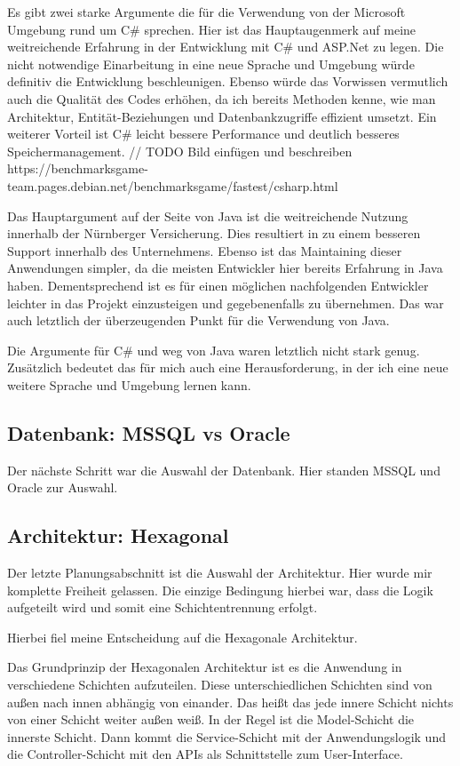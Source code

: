 Es gibt zwei starke Argumente die für die Verwendung von der Microsoft Umgebung rund um C\# sprechen.
Hier ist das Hauptaugenmerk auf meine weitreichende Erfahrung in der Entwicklung mit C\# und ASP.Net zu legen.
Die nicht notwendige Einarbeitung in eine neue Sprache und Umgebung würde definitiv die Entwicklung beschleunigen.
Ebenso würde das Vorwissen vermutlich auch die Qualität des Codes erhöhen, da ich bereits Methoden kenne, wie man Architektur, Entität-Beziehungen und Datenbankzugriffe effizient umsetzt.
Ein weiterer Vorteil ist C\# leicht bessere Performance und deutlich besseres Speichermanagement. 
// TODO Bild einfügen und beschreiben
https://benchmarksgame-team.pages.debian.net/benchmarksgame/fastest/csharp.html

Das Hauptargument auf der Seite von Java ist die weitreichende Nutzung innerhalb der Nürnberger Versicherung. Dies resultiert in zu einem besseren Support innerhalb des Unternehmens.
Ebenso ist das Maintaining dieser Anwendungen simpler, da die meisten Entwickler hier bereits Erfahrung in Java haben. Dementsprechend ist es für einen möglichen nachfolgenden Entwickler leichter
in das Projekt einzusteigen und gegebenenfalls zu übernehmen.
Das war auch letztlich der überzeugenden Punkt für die Verwendung von Java. 

Die Argumente für C\# und weg von Java waren letztlich nicht stark genug.
Zusätzlich bedeutet das für mich auch eine Herausforderung, in der ich eine neue weitere Sprache und Umgebung lernen kann.

\subsection{Datenbank: MSSQL vs Oracle}
Der nächste Schritt war die Auswahl der Datenbank. Hier standen MSSQL und Oracle zur Auswahl.
\subsection{Architektur: Hexagonal}
Der letzte Planungsabschnitt ist die Auswahl der Architektur. Hier wurde mir komplette Freiheit gelassen.
Die einzige Bedingung hierbei war, dass die Logik aufgeteilt wird und somit eine Schichtentrennung erfolgt.

Hierbei fiel meine Entscheidung auf die Hexagonale Architektur.

Das Grundprinzip der Hexagonalen Architektur ist es die Anwendung in verschiedene Schichten aufzuteilen.
Diese unterschiedlichen Schichten sind von außen nach innen abhängig von einander. Das heißt das jede innere Schicht nichts von einer Schicht weiter außen weiß.
In der Regel ist die Model-Schicht die innerste Schicht.
Dann kommt die Service-Schicht mit der Anwendungslogik und die Controller-Schicht mit den APIs als Schnittstelle zum User-Interface.

